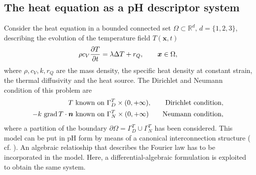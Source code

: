 \subsection{The heat equation as a pH descriptor system}
Consider the heat equation in a bounded connected set $\Omega \subset \mathbb{R}^d, \, d=\{1,2,3\}$, describing the evolution of the temperature field $T(\bm{x}, t)$
\begin{equation}\label{eq:heatEq}
\rho c_V \diffp{T}{t} = \lambda \Delta T + r_Q, \qquad \bm{x} \in \Omega,
\end{equation}
where $\rho, c_V, k, r_Q$ are the mass density, the specific heat density at constant strain, the thermal diffusivity and the heat source. The Dirichlet and Neumann condition of this problem are 
\begin{equation*}
	\begin{aligned}
	T \text{ known on } \Gamma_D^T \times (0, +\infty), \qquad \text{Dirichlet condition}, \\
	-k \, \operatorname*{grad} T \cdot \bm{n} \text{ known on } \Gamma_N^T \times (0, +\infty) \qquad \text{Neumann condition},
	\end{aligned}
\end{equation*}
where a partition of the boundary $\partial \Omega = \Gamma_D^T \cup \Gamma_N^T$ has been considered. This model can be put in pH form by means of a canonical interconnection structure ( cf. \cite[Chapter 2]{kotyczka2019numerical}). An algebraic relatioship that describes the Fourier law has to be incorporated in the model. Here, a differential-algebraic formulation is exploited to obtain the same system. \\

